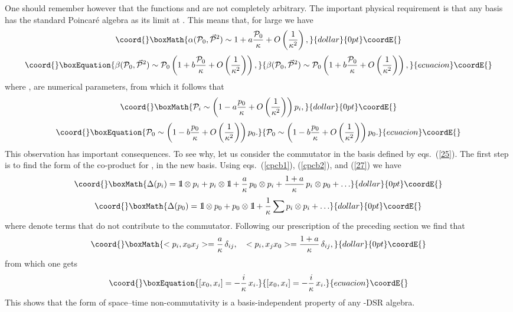 \documentclass [prd,twocolumn,nofootinbib,showpacs]  {revtex4}
\def\bbbone{{\mathchoice {\rm 1\mskip-4mu l} {\rm 1\mskip-4mu l}
{\rm 1\mskip-4.5mu l} {\rm 1\mskip-5mu l}}}
\begin{document}
One should remember however that the functions \myHighlight{$\alpha$}\coordHE{} and
\myHighlight{$\beta$}\coordHE{} are not completely arbitrary.  The important physical
requirement is that any basis has the standard Poincar\'e algebra
as its limit at \myHighlight{$\kappa\rightarrow\infty$}\coordHE{}. This means that, for
large \myHighlight{$\kappa$}\coordHE{} we have
$$\coord{}\boxMath{
 \alpha({\cal P}_0, \vec{{\cal    P}}{}^2) \sim 1 + a \frac{{\cal P}_0}{\kappa} + O\left(\frac{1}{\kappa^2}\right),
}{dollar}{0pt}\coordE{}$$
\begin{equation}\coord{}\boxEquation{\label{26}
\beta({\cal P}_0, \vec{{\cal    P}}{}^2) \sim {\cal P}_0\left(1 + b \frac{{\cal P}_0}{\kappa} +
O\left(\frac{1}{\kappa^2}\right)\right),
}{\beta({\cal P}_0, \vec{{\cal    P}}{}^2) \sim {\cal P}_0\left(1 + b \frac{{\cal P}_0}{\kappa} +
O\left(\frac{1}{\kappa^2}\right)\right),
}{ecuacion}\coordE{}\end{equation}
where \coordHE{}, \coordHE{} are numerical parameters, from which it follows that
$$\coord{}\boxMath{
 {\cal P}_i \sim \left(1 - a \frac{ p_0}{\kappa} + O\left(\frac{1}{\kappa^2}\right)\right)p_i,
}{dollar}{0pt}\coordE{}$$
\begin{equation}\coord{}\boxEquation{\label{27}
{\cal P}_0 \sim \left(1 - b \frac{p_0}{\kappa} + O\left(\frac{1}{\kappa^2}\right)\right)p_0.
}{{\cal P}_0 \sim \left(1 - b \frac{p_0}{\kappa} + O\left(\frac{1}{\kappa^2}\right)\right)p_0.
}{ecuacion}\coordE{}\end{equation}
 This observation has important consequences. To see why, let us consider the commutator \myHighlight{$[x_0, x_i]$}\coordHE{}
 in the basis defined by eqs.~(\ref{25}).  The first step is to find the form of the co-product for
 \coordHE{}, \coordHE{} in the new basis. Using eqs.~(\ref{cpcb1}), (\ref{cpcb2}), and (\ref{27}) we have
$$\coord{}\boxMath{
\Delta(p_i) = \bbbone \otimes p_{i} + p_{i} \otimes \bbbone +
  {\frac{a}{\kappa}}\, p_{0} \otimes p_{i} + {\frac{1+a}{\kappa}}\, p_{i} \otimes p_{0} + \ldots
}{dollar}{0pt}\coordE{}$$  $$\coord{}\boxMath{
\Delta(p_0) =\bbbone \otimes p_{0} + p_{0} \otimes \bbbone +
  \frac{1}{\kappa}\sum p_{i}\otimes p_{i}+ \ldots
}{dollar}{0pt}\coordE{}$$
where \myHighlight{$\ldots$}\coordHE{} denote  terms that do not contribute to the
commutator. Following our prescription of the preceding  section
we find that
$$\coord{}\boxMath{
<p_i, x_0 x_j> = \frac{a}\kappa\, \delta_{ij}, \quad <p_i,  x_jx_0>=\frac{1+a}\kappa\, \delta_{ij},
}{dollar}{0pt}\coordE{}$$
from which one gets
\begin{equation}\coord{}\boxEquation{\label{28}
[x_0, x_i] = -\frac{i}\kappa\, x_i.
}{[x_0, x_i] = -\frac{i}\kappa\, x_i.
}{ecuacion}\coordE{}\end{equation}
This shows that the form of space--time non-commutativity is a basis-independent property of any \myHighlight{$\kappa$}\coordHE{}-DSR algebra.
\end{document}
